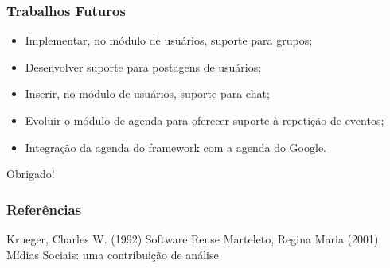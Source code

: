 \documentclass{beamer}
\begin{document}
\begin{frame}
\frametitle{Trabalhos Futuros}

\begin{itemize}
	\item Implementar, no módulo de usuários, suporte para grupos;
	\item Desenvolver suporte para postagens de usuários;
	\item Inserir, no módulo de usuários, suporte para chat;
	\item Evoluir o módulo de agenda para oferecer suporte à repetição de eventos;
	\item Integração da agenda do framework com a agenda do Google.
\end{itemize}

\end{frame}

\begin{frame}
\Huge{\centerline{Obrigado!}}
\end{frame}

\begin{frame}
\frametitle{Referências}
\footnotesize{
\begin{thebibliography}{99} %
 Krueger, Charles W. (1992)
\newblock Software Reuse
 Marteleto, Regina Maria (2001)
\newblock Mídias Sociais: uma contribuição de análise
\end{thebibliography}
}
\end{frame}
\end{document}
